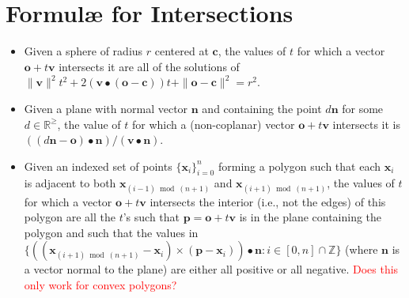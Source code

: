 \documentclass{article}
\newcommand{\comm}{\textcolor{red}}  %
\renewcommand{\v}{\mathbf}
\newcommand{\Z}{\mathbb{Z}}
\newcommand{\R}{\mathbb{R}}
\begin{document}
\section*{Formul\ae{} for Intersections}
\begin{itemize}
\item Given a sphere of radius $r$ centered at $\v{c}$, the values of $t$ for which a vector $\v{o}+t\v{v}$ intersects it are all of the solutions of $\|\v{v}\|^2 t^2 + 2(\v{v}\bullet(\v{o}-\v{c})) t + \|\v{o}-\v{c}\|^2 = r^2$.
\item Given a plane with normal vector $\v{n}$ and containing the point $d\v{n}$ for some $d\in\R^\geq$, the value of $t$ for which a (non-coplanar) vector $\v{o}+t\v{v}$ intersects it is $((d\v{n}-\v{o})\bullet\v{n})/(\v{v}\bullet\v{n})$.
\item Given an indexed set of points $\{\v{x}_i\}_{i=0}^n$ forming a polygon such that each $\v{x}_i$ is adjacent to both $\v{x}_{(i-1)\bmod(n+1)}$ and $\v{x}_{(i+1)\bmod(n+1)}$, the values of $t$ for which a vector $\v{o}+t\v{v}$ intersects the interior (i.e., not the edges) of this polygon are all the $t$'s such that $\v{p} = \v{o}+t\v{v}$ is in the plane containing the polygon and such that the values in $\{((\v{x}_{(i+1)\bmod(n+1)} - \v{x}_i)\times(\v{p} - \v{x}_i))\bullet\v{n} : i\in[0,n]\cap\Z\}$ (where $\v{n}$ is a vector normal to the plane) are either all positive or all negative.  \comm{Does this only work for convex polygons?}
\end{itemize}
\end{document}
